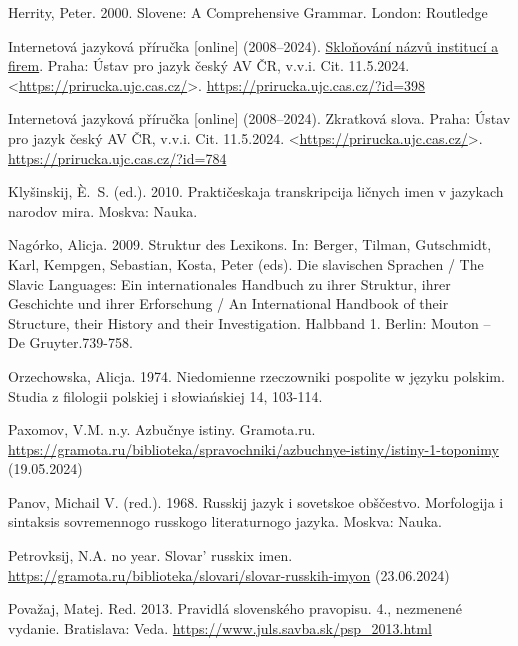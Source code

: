 \documentclass[output=paper]{langscibook}
\begin{document}
Herrity, Peter. 2000. Slovene: A Comprehensive Grammar. London: Routledge

Internetová jazyková příručka [online] (2008–2024). \href{https://prirucka.ujc.cas.cz/#div398}{{Skloňování názvů institucí a firem}}{.} Praha: Ústav pro jazyk český AV ČR, v.\hspace{0.2em}v.\hspace{0.2em}i. Cit. 11.\hspace{0.2em}5.\hspace{0.2em}2024. <\url{https://prirucka.ujc.cas.cz/}>. \url{https://prirucka.ujc.cas.cz/?id=398} 

Internetová jazyková příručka [online] (2008–2024). Zkratková slova. Praha: Ústav pro jazyk český AV ČR, v.\hspace{0.2em}v.\hspace{0.2em}i. Cit. 11.\hspace{0.2em}5.\hspace{0.2em}2024. <\url{https://prirucka.ujc.cas.cz/}>. \url{https://prirucka.ujc.cas.cz/?id=784} 

Klyšinskij, È.~S. (ed.). 2010. Praktičeskaja transkripcija ličnych imen v jazykach narodov mira. Moskva: Nauka.

Nagórko, Alicja. 2009. Struktur des Lexikons. In: Berger, Tilman, Gutschmidt, Karl, Kempgen, Sebastian, Kosta, Peter (eds). Die slavischen Sprachen / The Slavic Languages: Ein internationales Handbuch zu ihrer Struktur, ihrer Geschichte und ihrer Erforschung / An International Handbook of their Structure, their History and their Investigation. Halbband 1. Berlin: Mouton – De Gruyter.739-758.

Orzechowska, Alicja. 1974. Niedomienne rzeczowniki pospolite w języku polskim. Studia z filologii polskiej i słowiańskiej 14, 103-114.

Paxomov, V.M. n.y.   Azbučnye istiny. Gramota.ru. \url{https://gramota.ru/biblioteka/spravochniki/azbuchnye-istiny/istiny-1-toponimy} (19.05.2024)

Panov, Michail V. (red.). 1968. Russkij jazyk i sovetskoe obščestvo. Morfologija i sintaksis sovremennogo russkogo literaturnogo jazyka. Moskva: Nauka.

Petrovksij, N.A. no year. Slovar’ russkix imen. \url{https://gramota.ru/biblioteka/slovari/slovar-russkih-imyon} (23.06.2024)

Považaj, Matej. Red. 2013. Pravidlá slovenského pravopisu. 4., nezmenené vydanie. Bratislava: Veda. \url{https://www.juls.savba.sk/psp_2013.html} 
\end{document}
